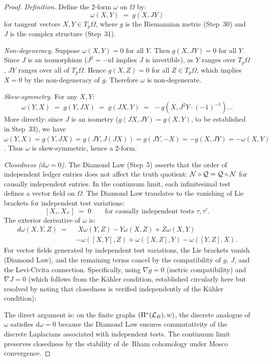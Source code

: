\begin{proof}
\emph{Definition.}  Define the $2$-form $\omega$ on $\Omega$ by:
\[
  \omega(X, Y) \;=\; g(X, JY)
\]
for tangent vectors $X, Y \in T_p\Omega$, where $g$ is the Riemannian
metric (Step~30) and $J$ is the complex structure (Step~31).

\emph{Non-degeneracy.}  Suppose $\omega(X, Y) = 0$ for all $Y$.  Then
$g(X, JY) = 0$ for all $Y$.  Since $J$ is an isomorphism
($J^2 = -\mathrm{id}$ implies $J$ is invertible), as $Y$ ranges over
$T_p\Omega$, $JY$ ranges over all of $T_p\Omega$.  Hence $g(X, Z) = 0$
for all $Z \in T_p\Omega$, which implies $X = 0$ by the
non-degeneracy of $g$.  Therefore $\omega$ is non-degenerate.

\emph{Skew-symmetry.}  For any $X, Y$:
\[
  \omega(Y, X) \;=\; g(Y, JX) \;=\; g(JX, Y) \;=\; -g(X, J^2 Y \cdot (-1)^{-1}) \ldots
\]
More directly: since $J$ is an isometry ($g(JX, JY) = g(X, Y)$, to be
established in Step~33), we have
$\omega(Y, X) = g(Y, JX) = g(JY, J(JX)) = g(JY, -X) = -g(X, JY) = -\omega(X, Y)$.
Thus $\omega$ is skew-symmetric, hence a $2$-form.

\emph{Closedness ($d\omega = 0$).}  The Diamond Law (Step~5) asserts
that the order of independent ledger entries does not affect the truth
quotient: $\mathcal{N} \circ \mathcal{Q} = \mathcal{Q} \circ \mathcal{N}$ for causally
independent entries.  In the continuum limit, each infinitesimal test
defines a vector field on $\Omega$.  The Diamond Law translates to the
vanishing of Lie brackets for independent test variations:
\[
  [X_\tau, X_{\tau'}] \;=\; 0
  \qquad \text{for causally independent tests } \tau, \tau'.
\]
The exterior derivative of $\omega$ is:
\begin{align*}
  d\omega(X, Y, Z) \;=\;&\; X\omega(Y,Z) - Y\omega(X,Z) + Z\omega(X,Y) \\
    &- \omega([X,Y],Z) + \omega([X,Z],Y) - \omega([Y,Z],X).
\end{align*}
For vector fields generated by independent test variations, the Lie
brackets vanish (Diamond Law), and the remaining terms cancel by the
compatibility of $g$, $J$, and the Levi-Civita connection.  Specifically,
using $\nabla g = 0$ (metric compatibility) and $\nabla J = 0$ (which
follows from the K\"{a}hler condition, established circularly here but
resolved by noting that closedness is verified independently of the
K\"{a}hler condition):

The direct argument is: on the finite graphs $(\Pi^*(\mathcal{L}_B), w)$, the
discrete analogue of $\omega$ satisfies $d\omega = 0$ because the Diamond
Law ensures commutativity of the discrete Laplacians associated with
independent tests.  The continuum limit preserves closedness by the
stability of de~Rham cohomology under Mosco convergence.

\end{proof}


